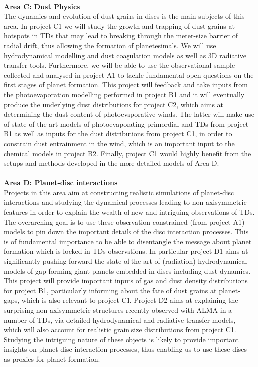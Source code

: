 \documentclass[10pt,fleqn,twoside]{article}
\newcommand{\AreacolC}{\color{YellowOrange}}
\newcommand{\AreacolD}{\color{Red}}
\begin{document}
%
\mbox{}\vspace{1em}\\
\noindent\underline{\bf\AreacolC Area C: Dust Physics}\\
\noindent The dynamics and evolution of dust grains in discs is the
main subjects of this area. In project C1 we will study the growth and
trapping of dust grains at hotspots in TDs that may lead
to breaking through the meter-size barrier of radial drift, thus
allowing the formation of planetesimals. We will use hydrodynamical
modelling and dust coagulation models as well as 3D 
radiative transfer tools. Furthermore, we will be able to use the
observational sample collected and analysed in project A1 to tackle
fundamental open questions on the first stages of planet
formation. This project will feedback and take inputs from the
photoevaporation modelling performed in project B1 and it will
eventually produce
the underlying dust distributions for project C2, which aims at
determining the dust content of photoevaporative winds. The latter
will make use of state-of-the art models of photoevaporating
primordial and TDs from project B1 as well as inputs for the dust distributions from
project C1, in order to constrain dust entrainment in the wind, which
is an important input to the chemical models in project B2. Finally,
project C1 would highly benefit from the setups and methods developed
in the more detailed models of Area D.\\ 




\mbox{}\vspace{1em}\\
\noindent\underline{\bf\AreacolD Area D: Planet-disc interactions}\\
\noindent Projects in this area aim at constructing realistic
simulations of planet-disc interactions and studying the dynamical processes
leading to non-axisymmetric features in order to explain the wealth of new
and intriguing observations of TDs. The overarching goal is to use
these observation-constrained (from project A1) models to pin down
the important details of the disc interaction processes. This is of
fundamental importance to be able to disentangle the message about
planet formation which is locked in TDs observations. In particular
project D1 aims at significantly pushing forward the state-of-the art
of (radiation)-hydrodynamical models of gap-forming giant planets
embedded in discs including dust dynamics. 
This project will provide important inputs of
gas and dust density distributions for project B1, particularly informing about the
fate of dust grains at planet-gaps, which is also relevant to project
C1. Project D2 aims at explaining the surprising non-axisymmetric
structures recently observed with ALMA in a number of TDs, via
detailed hydrodynamical and radiative transfer models, which will also
account for realistic grain size distributions from project
C1. Studying the intriguing nature of these objects is likely to
provide important insights on planet-disc interaction processes, thus
enabling us to use these discs as proxies for planet formation.  \\ 
\end{document}
